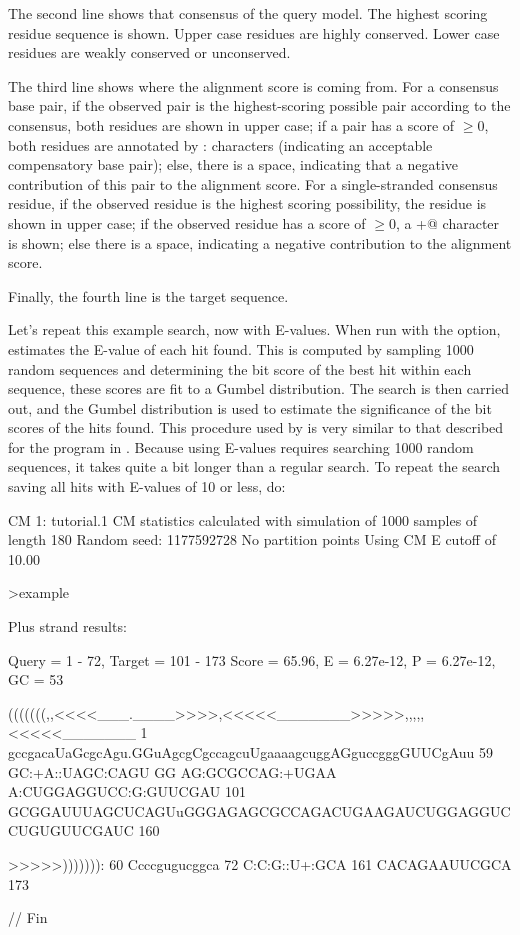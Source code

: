 The second line shows that consensus of the query model. The highest
scoring residue sequence is shown. Upper case residues are highly
conserved. Lower case residues are weakly conserved or unconserved.

The third line shows where the alignment score is coming from. For a
consensus base pair, if the observed pair is the highest-scoring
possible pair according to the consensus, both residues are shown in
upper case; if a pair has a score of $\geq 0$, both residues are
annotated by : characters (indicating an acceptable compensatory base
pair); else, there is a space, indicating that a negative contribution
of this pair to the alignment score. For a single-stranded consensus
residue, if the observed residue is the highest scoring possibility,
the residue is shown in upper case; if the observed residue has a
score of $\geq 0$, a \verb@+@ character is shown; else there is a
space, indicating a negative contribution to the alignment score.

Finally, the fourth line is the target sequence.

Let's repeat this example search, now with E-values. When run with the
 option,  estimates the E-value of each hit
found. This is
computed by sampling 1000 random sequences and determining the bit
score of the best hit within each sequence, these scores are fit to a
Gumbel distribution. The search is then carried out, and the Gumbel
distribution is used to estimate the significance of the bit scores of
the hits found. This procedure used by  is very
similar to that described for the  program in
\cite{KleinEddy03}. Because using E-values requires searching
1000 random sequences, it takes quite a bit longer than a regular
search. To repeat the search saving all hits with E-values of 10 or
less, do:


{\samepage
\begin{sreoutput}
CM 1: tutorial.1
CM statistics calculated with simulation of 1000 samples of length 180
Random seed: 1177592728
No partition points
Using CM E cutoff of 10.00

>example

  Plus strand results:

 Query = 1 - 72, Target = 101 - 173
 Score = 65.96, E = 6.27e-12, P = 6.27e-12, GC =  53

           (((((((,,<<<<___.____>>>>,<<<<<_______>>>>>,,,,,<<<<<_______
         1 gccgacaUaGcgcAgu.GGuAgcgCgccagcuUgaaaagcuggAGguccgggGUUCgAuu 59      
           GC:+A::UAGC:CAGU GG AG:GCGCCAG:+UGAA A:CUGGAGGUCC:G:GUUCGAU 
       101 GCGGAUUUAGCUCAGUuGGGAGAGCGCCAGACUGAAGAUCUGGAGGUCCUGUGUUCGAUC 160     

           >>>>>))))))):
        60 Ccccgugucggca 72      
           C:C:G::U+:GCA
       161 CACAGAAUUCGCA 173     


//
Fin
\end{sreoutput}
}

